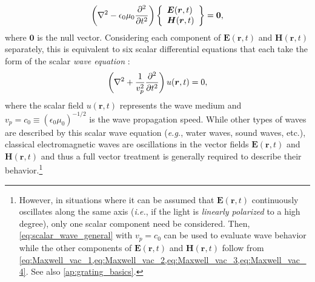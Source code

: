 \begin{equation} \label{eq:wave_vector_vac}
 \left( \laplacian - \epsilon_0 \mu_0 \pdv[2]{t} \right) \left\{
  \begin{array}{lr}
  \mathbold{E}(\mathbold{r},t)\\
  \mathbold{H}(\mathbold{r},t)
  \end{array}
 \right\} = \mathbf{0} ,
 \end{equation}
where $\mathbf{0}$ is the null vector. 
Considering each component of $\mathbold{E}(\mathbold{r},t)$ and $\mathbold{H}(\mathbold{r},t)$ separately, this is equivalent to six scalar differential equations that each take the form of the scalar \emph{wave equation} \cite{Born80,Griffiths17}: 
\begin{equation} \label{eq:scalar_wave_general}
 \left( \laplacian + \frac{1}{v_p^2} \pdv[2]{t} \right) u (\mathbold{r},t) = 0 ,
 \end{equation}
where the scalar field $u (\mathbold{r},t)$ represents the wave medium and $v_p = c_0 \equiv \left( \epsilon_0 \mu_0 \right)^{-1/2}$ is the wave propagation speed. 
While other types of waves are described by this scalar wave equation (\emph{e.g.}, water waves, sound waves, etc.), classical electromagnetic waves are oscillations in the vector fields $\mathbold{E}(\mathbold{r},t)$ and $\mathbold{H}(\mathbold{r},t)$ and thus a full vector treatment is generally required to describe their behavior.\footnote{However, in situations where it can be assumed that $\mathbold{E}(\mathbold{r},t)$ continuously oscillates along the same axis (\emph{i.e.}, if the light is \emph{linearly polarized} to a high degree), only one scalar component need be considered. 
Then, \cref{eq:scalar_wave_general} with $v_p = c_0$ can be used to evaluate wave behavior while the other components of $\mathbold{E}(\mathbold{r},t)$ and $\mathbold{H}(\mathbold{r},t)$ follow from \cref{eq:Maxwell_vac_1,eq:Maxwell_vac_2,eq:Maxwell_vac_3,eq:Maxwell_vac_4}. See also \cref{ap:grating_basics}.}

